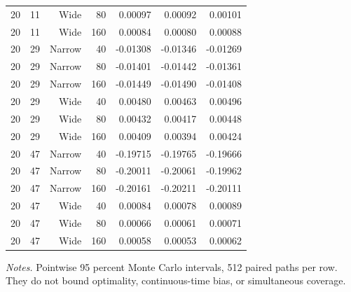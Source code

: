 \begin{small}
\begin{longtable}{lrrrrrr}
20 & 11 & Wide & 80 & 0.00097 & 0.00092 & 0.00101 \\
20 & 11 & Wide & 160 & 0.00084 & 0.00080 & 0.00088 \\
20 & 29 & Narrow & 40 & -0.01308 & -0.01346 & -0.01269 \\
20 & 29 & Narrow & 80 & -0.01401 & -0.01442 & -0.01361 \\
20 & 29 & Narrow & 160 & -0.01449 & -0.01490 & -0.01408 \\
20 & 29 & Wide & 40 & 0.00480 & 0.00463 & 0.00496 \\
20 & 29 & Wide & 80 & 0.00432 & 0.00417 & 0.00448 \\
20 & 29 & Wide & 160 & 0.00409 & 0.00394 & 0.00424 \\
20 & 47 & Narrow & 40 & -0.19715 & -0.19765 & -0.19666 \\
20 & 47 & Narrow & 80 & -0.20011 & -0.20061 & -0.19962 \\
20 & 47 & Narrow & 160 & -0.20161 & -0.20211 & -0.20111 \\
20 & 47 & Wide & 40 & 0.00084 & 0.00078 & 0.00089 \\
20 & 47 & Wide & 80 & 0.00066 & 0.00061 & 0.00071 \\
20 & 47 & Wide & 160 & 0.00058 & 0.00053 & 0.00062 \\
\bottomrule\end{longtable}\end{small}
\noindent\textit{Notes.} Pointwise 95 percent Monte Carlo intervals, 512 paired paths per row. They do not bound optimality, continuous-time bias, or simultaneous coverage.

